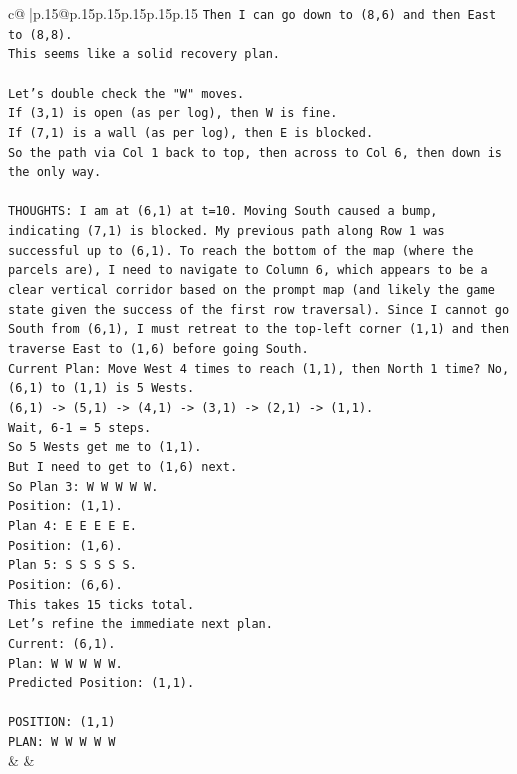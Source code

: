 \documentclass{article}
\begin{document}
{\begin{supertabular}{c@{$\;$}|p{.15\linewidth}@{}p{.15\linewidth}p{.15\linewidth}p{.15\linewidth}p{.15\linewidth}p{.15\linewidth}}
{{{\texttt{Then I can go down to (8,6) and then East to (8,8).} \\
\texttt{This seems like a solid recovery plan.} \\
\\ 
\texttt{Let's double check the "W" moves.} \\
\texttt{If (3,1) is open (as per log), then W is fine.} \\
\texttt{If (7,1) is a wall (as per log), then E is blocked.} \\
\texttt{So the path via Col 1 back to top, then across to Col 6, then down is the only way.} \\
\\ 
\texttt{THOUGHTS: I am at (6,1) at t=10. Moving South caused a bump, indicating (7,1) is blocked. My previous path along Row 1 was successful up to (6,1). To reach the bottom of the map (where the parcels are), I need to navigate to Column 6, which appears to be a clear vertical corridor based on the prompt map (and likely the game state given the success of the first row traversal). Since I cannot go South from (6,1), I must retreat to the top{-}left corner (1,1) and then traverse East to (1,6) before going South.} \\
\texttt{Current Plan: Move West 4 times to reach (1,1), then North 1 time? No, (6,1) to (1,1) is 5 Wests.} \\
\texttt{(6,1) {-}> (5,1) {-}> (4,1) {-}> (3,1) {-}> (2,1) {-}> (1,1).} \\
\texttt{Wait, 6{-}1 = 5 steps.} \\
\texttt{So 5 Wests get me to (1,1).} \\
\texttt{But I need to get to (1,6) next.} \\
\texttt{So Plan 3: W W W W W.} \\
\texttt{Position: (1,1).} \\
\texttt{Plan 4: E E E E E.} \\
\texttt{Position: (1,6).} \\
\texttt{Plan 5: S S S S S.} \\
\texttt{Position: (6,6).} \\
\texttt{This takes 15 ticks total.} \\
\texttt{Let's refine the immediate next plan.} \\
\texttt{Current: (6,1).} \\
\texttt{Plan: W W W W W.} \\
\texttt{Predicted Position: (1,1).} \\
\\ 
\texttt{POSITION: (1,1)} \\
\texttt{PLAN: W W W W W} \\
            }
        }
    }
    & & \\ \\


\end{supertabular}}
\end{document}
